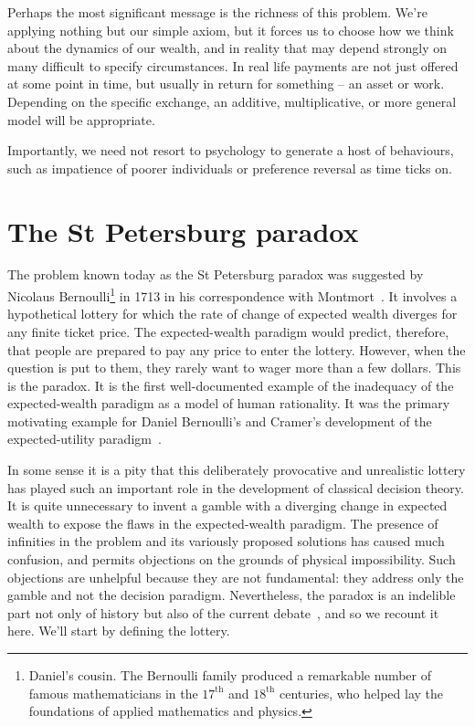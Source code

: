 Perhaps the most significant message is the richness of this problem. We're applying nothing but our simple axiom, but it forces us to choose how we think about the dynamics of our wealth, and in reality that may depend strongly on many difficult to specify circumstances. In real life payments are not just offered at some point in time, but usually in return for something -- an asset or work. Depending on the specific exchange, an additive, multiplicative, or more general model will be appropriate.

Importantly, we need not resort to psychology to generate a host of behaviours, such as impatience of poorer individuals or preference reversal as time ticks on.


\section{The St Petersburg paradox}
The problem known today as the St Petersburg paradox was suggested by Nicolaus 
Bernoulli\footnote{Daniel's cousin. The Bernoulli family produced a remarkable 
number of famous mathematicians in the $17^\text{th}$ and $18^\text{th}$ centuries, 
who helped lay the foundations of applied mathematics and physics.} in 1713 in his 
correspondence with Montmort~\cite{Montmort1713}. It involves a hypothetical 
lottery for which the rate of change of expected wealth diverges for any finite ticket 
price. The expected-wealth paradigm would predict, therefore, that people are 
prepared to pay any price to enter the lottery. However, when the question is put 
to them, they rarely want to wager more than a few dollars. This 
is the paradox. It is the first well-documented example of the inadequacy of the 
expected-wealth paradigm as a model of human rationality. It was the primary 
motivating example for Daniel Bernoulli's and Cramer's development of the 
expected-utility paradigm~\cite{Bernoulli1738}.

In some sense it is a pity that this deliberately provocative and unrealistic lottery has played such an important role in the development of classical decision theory. It is quite unnecessary to invent a gamble with a diverging change in expected wealth to expose the flaws in the expected-wealth paradigm. The presence of infinities in the problem and its variously proposed solutions has caused much confusion, and permits objections on the grounds of physical impossibility. Such objections are unhelpful because they are not fundamental: they address only the gamble and not the decision paradigm. Nevertheless, the paradox is an indelible part not only of history but also of the current debate~\cite{Peters2011b}, and so we recount it here. We'll start by defining the lottery.

